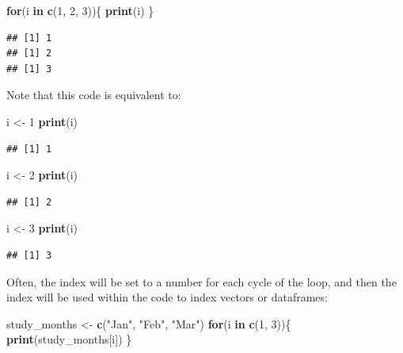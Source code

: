 \documentclass[]{book}
\makeatletter
\newenvironment{Shaded}{\begin{snugshade}}{\end{snugshade}}
\newcommand{\KeywordTok}[1]{\textcolor[rgb]{0.13,0.29,0.53}{\textbf{#1}}}
\newcommand{\DecValTok}[1]{\textcolor[rgb]{0.00,0.00,0.81}{#1}}
\newcommand{\StringTok}[1]{\textcolor[rgb]{0.31,0.60,0.02}{#1}}
\newcommand{\ControlFlowTok}[1]{\textcolor[rgb]{0.13,0.29,0.53}{\textbf{#1}}}
\newcommand{\NormalTok}[1]{#1}
\newenvironment{kframe}{%
\medskip{}
\setlength{\fboxsep}{.8em}
 \def\at@end@of@kframe{}%
 \ifinner\ifhmode%
  \def\at@end@of@kframe{\end{minipage}}%
  \begin{minipage}{\columnwidth}%
 \fi\fi%
 \def\FrameCommand##1{\hskip\@totalleftmargin \hskip-\fboxsep
 \colorbox{shadecolor}{##1}\hskip-\fboxsep
     \hskip-\linewidth \hskip-\@totalleftmargin \hskip\columnwidth}%
 \MakeFramed {\advance\hsize-\width
   \@totalleftmargin\z@ \linewidth\hsize
   \@setminipage}}%
 {\par\unskip\endMakeFramed%
 \at@end@of@kframe}
\renewenvironment{Shaded}{\begin{kframe}}{\end{kframe}}
\theoremstyle{definition}
\theoremstyle{definition}
\theoremstyle{definition}
\theoremstyle{remark}
\makeatother
\begin{document}
\begin{Shaded}
\begin{Highlighting}[]
\ControlFlowTok{for}\NormalTok{(i }\ControlFlowTok{in} \KeywordTok{c}\NormalTok{(}\DecValTok{1}\NormalTok{, }\DecValTok{2}\NormalTok{, }\DecValTok{3}\NormalTok{))\{}
        \KeywordTok{print}\NormalTok{(i)}
\NormalTok{\}}
\end{Highlighting}
\end{Shaded}

\begin{verbatim}
## [1] 1
## [1] 2
## [1] 3
\end{verbatim}

Note that this code is equivalent to:

\begin{Shaded}
\begin{Highlighting}[]
\NormalTok{i <-}\StringTok{ }\DecValTok{1}
\KeywordTok{print}\NormalTok{(i)}
\end{Highlighting}
\end{Shaded}

\begin{verbatim}
## [1] 1
\end{verbatim}

\begin{Shaded}
\begin{Highlighting}[]
\NormalTok{i <-}\StringTok{ }\DecValTok{2}
\KeywordTok{print}\NormalTok{(i)}
\end{Highlighting}
\end{Shaded}

\begin{verbatim}
## [1] 2
\end{verbatim}

\begin{Shaded}
\begin{Highlighting}[]
\NormalTok{i <-}\StringTok{ }\DecValTok{3}
\KeywordTok{print}\NormalTok{(i)}
\end{Highlighting}
\end{Shaded}

\begin{verbatim}
## [1] 3
\end{verbatim}

Often, the index will be set to a number for each cycle of the loop, and
then the index will be used within the code to index vectors or
dataframes:

\begin{Shaded}
\begin{Highlighting}[]
\NormalTok{study_months <-}\StringTok{ }\KeywordTok{c}\NormalTok{(}\StringTok{"Jan"}\NormalTok{, }\StringTok{"Feb"}\NormalTok{, }\StringTok{"Mar"}\NormalTok{)}
\ControlFlowTok{for}\NormalTok{(i }\ControlFlowTok{in} \KeywordTok{c}\NormalTok{(}\DecValTok{1}\NormalTok{, }\DecValTok{3}\NormalTok{))\{}
        \KeywordTok{print}\NormalTok{(study_months[i])}
\NormalTok{\}}
\end{Highlighting}
\end{Shaded}
\end{document}
